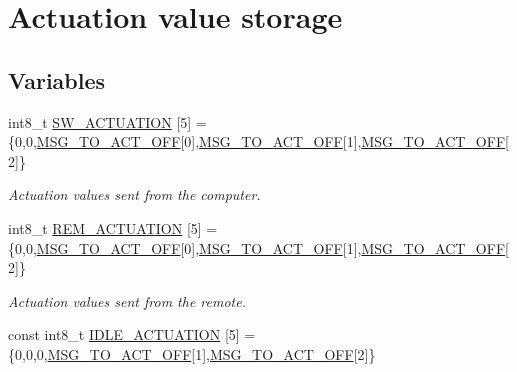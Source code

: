 \hypertarget{group__ActuationValueStorage}{}\section{Actuation value storage}
\label{group__ActuationValueStorage}
\subsection*{Variables}
\begin{DoxyCompactItemize}
\item 
int8\+\_\+t \hyperlink{group__ActuationValueStorage_ga7c78ea1be4ba9168380940fe5fdb889f}{S\+W\+\_\+\+A\+C\+T\+U\+A\+T\+I\+ON} \mbox{[}5\mbox{]} = \{0,0,\hyperlink{group__MsgBitPositions_ga7e9874545710fd223a9d783f83e11a62}{M\+S\+G\+\_\+\+T\+O\+\_\+\+A\+C\+T\+\_\+\+O\+FF}\mbox{[}0\mbox{]},\hyperlink{group__MsgBitPositions_ga7e9874545710fd223a9d783f83e11a62}{M\+S\+G\+\_\+\+T\+O\+\_\+\+A\+C\+T\+\_\+\+O\+FF}\mbox{[}1\mbox{]},\hyperlink{group__MsgBitPositions_ga7e9874545710fd223a9d783f83e11a62}{M\+S\+G\+\_\+\+T\+O\+\_\+\+A\+C\+T\+\_\+\+O\+FF}\mbox{[}2\mbox{]}\}\hypertarget{group__ActuationValueStorage_ga7c78ea1be4ba9168380940fe5fdb889f}{}\label{group__ActuationValueStorage_ga7c78ea1be4ba9168380940fe5fdb889f}

\begin{DoxyCompactList}\small\item\em Actuation values sent from the computer. \end{DoxyCompactList}\item 
int8\+\_\+t \hyperlink{group__ActuationValueStorage_gaa62470a230859dd30f46b50aa6c0536e}{R\+E\+M\+\_\+\+A\+C\+T\+U\+A\+T\+I\+ON} \mbox{[}5\mbox{]} = \{0,0,\hyperlink{group__MsgBitPositions_ga7e9874545710fd223a9d783f83e11a62}{M\+S\+G\+\_\+\+T\+O\+\_\+\+A\+C\+T\+\_\+\+O\+FF}\mbox{[}0\mbox{]},\hyperlink{group__MsgBitPositions_ga7e9874545710fd223a9d783f83e11a62}{M\+S\+G\+\_\+\+T\+O\+\_\+\+A\+C\+T\+\_\+\+O\+FF}\mbox{[}1\mbox{]},\hyperlink{group__MsgBitPositions_ga7e9874545710fd223a9d783f83e11a62}{M\+S\+G\+\_\+\+T\+O\+\_\+\+A\+C\+T\+\_\+\+O\+FF}\mbox{[}2\mbox{]}\}\hypertarget{group__ActuationValueStorage_gaa62470a230859dd30f46b50aa6c0536e}{}\label{group__ActuationValueStorage_gaa62470a230859dd30f46b50aa6c0536e}

\begin{DoxyCompactList}\small\item\em Actuation values sent from the remote. \end{DoxyCompactList}\item 
const int8\+\_\+t \hyperlink{group__ActuationValueStorage_ga39e6648fcb502c3da718d80b661974ae}{I\+D\+L\+E\+\_\+\+A\+C\+T\+U\+A\+T\+I\+ON} \mbox{[}5\mbox{]} = \{0,0,0,\hyperlink{group__MsgBitPositions_ga7e9874545710fd223a9d783f83e11a62}{M\+S\+G\+\_\+\+T\+O\+\_\+\+A\+C\+T\+\_\+\+O\+FF}\mbox{[}1\mbox{]},\hyperlink{group__MsgBitPositions_ga7e9874545710fd223a9d783f83e11a62}{M\+S\+G\+\_\+\+T\+O\+\_\+\+A\+C\+T\+\_\+\+O\+FF}\mbox{[}2\mbox{]}\}\hypertarget{group__ActuationValueStorage_ga39e6648fcb502c3da718d80b661974ae}{}\label{group__ActuationValueStorage_ga39e6648fcb502c3da718d80b661974ae}


\end{DoxyCompactItemize}
